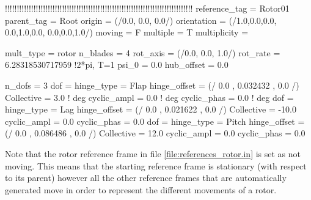 \begin{inputfile}[frame=single, caption={references\_rotor.in}, label={file:references_rotor.in}]
!!!!!!!!!!!!!!!!!!!!!!!!!!!!!!!!!!!!!!!!!!!!!!!!!!!!!!!!!!!!!!!!!!!!!!!!!!!!!!!
reference_tag = Rotor01
parent_tag = Root
origin = (/0.0, 0.0, 0.0/)
orientation = (/1.0,0.0,0.0, 0.0,1.0,0.0, 0.0,0.0,1.0/)
moving = F
multiple = T
multiplicity = {
  mult_type = rotor
  n_blades = 4
  rot_axis = (/0.0, 0.0, 1.0/)
  rot_rate = 6.28318530717959 !2*pi, T=1
  psi_0 = 0.0
  hub_offset = 0.0

  n_dofs = 3
  dof = {
    hinge_type = Flap
    hinge_offset = (/ 0.0 , 0.032432 , 0.0 /)
    Collective  =  3.0     ! deg
    cyclic_ampl =  0.0     ! deg
    cyclic_phas =  0.0     ! deg
  }
  dof = {
    hinge_type = Lag
    hinge_offset = (/ 0.0 , 0.021622 , 0.0 /)
    Collective  = -10.0
    cyclic_ampl =  0.0
    cyclic_phas =  0.0
  }
  dof = {
    hinge_type = Pitch
    hinge_offset = (/ 0.0 , 0.086486 , 0.0 /)
    Collective  = 12.0
    cyclic_ampl =  0.0
    cyclic_phas =  0.0
  }

}


\end{inputfile}
 Note that the rotor reference frame in file \ref{file:references_rotor.in} is set as not moving. This means that the starting reference frame is stationary (with respect to its parent) however all the other reference frames that are automatically generated move in order to represent the different movements of a rotor.
 
